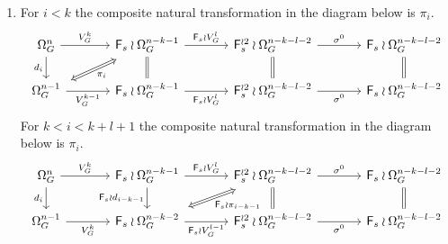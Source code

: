 \documentclass[a4paper,10pt]{article}%
\begin{document}
\begin{proposition}
\begin{enumerate}[label=(\alph*)]
\item
For $i<k$ the composite natural transformation in the diagram below is $\pi_i$.
\begin{equation}\label{INDPI1 EQ}
\begin{tikzcd}[row sep=1.7em,column sep = 3.5em]
	\Omega_{G}^{n} \ar{d}[swap]{d_{i}} \ar{r}{V_G^k} &
	|[alias=F1]|
	\Fin_s \wr \Omega_{G}^{n-k-1} \ar{r}{\Fin_s \wr V_{G}^l} 
	\ar[equal]{d} &
	\Fin_s^{\wr 2} \wr \Omega_G^{n-k-l-2} \ar[equal]{d} \ar{r}{\sigma^0} &
	\Fin_s \wr \Omega_G^{n-k-l-2} \ar[equal]{d}
\\
	|[alias=G2]|
	\Omega_{G}^{n-1} \ar{r}[swap]{V_G^{k-1}}&
	\Fin_s \wr \Omega_{G}^{n-k-1} \ar{r}[swap]{\Fin_s \wr V_{G}^{l}} &
	\Fin_s^{\wr 2} \wr  \Omega_G^{n-k-l-2} \ar{r}[swap]{\sigma^0} &
	\Fin_s \wr  \Omega_G^{n-k-l-2}
\arrow[Leftrightarrow, from=F1, to=G2,shorten >=0.15cm,shorten <=0.15cm,"\pi_{i}"]
\end{tikzcd}
\end{equation}
For $k< i < k+l+1$ the composite natural transformation in the diagram below is $\pi_{i}$.
\begin{equation}\label{INDPI2 EQ}
\begin{tikzcd}[row sep=1.7em,column sep = 3.5em]
	\Omega_{G}^{n} \ar{d}[swap]{d_{i}} \ar{r}{V_G^k} &
	\Fin_s \wr \Omega_{G}^{n-k-1} \ar{r}{\Fin_s \wr V_{G}^l} 
	\ar{d}[swap]{\Fin_s \wr d_{i-k-1}} &
	|[alias=F1]|
	\Fin_s^{\wr 2} \wr \Omega_G^{n-k-l-2} \ar[equal]{d} \ar{r}{\sigma^0} &
	\Fin_s \wr \Omega_G^{n-k-l-2} \ar[equal]{d}
\\
	\Omega_{G}^{n-1} \ar{r}[swap]{V_G^k}&
	|[alias=G2]|
	\Fin_s \wr \Omega_{G}^{n-k-2} \ar{r}[swap]{\Fin_s \wr V_{G}^{l-1}} &
	\Fin_s^{\wr 2} \wr  \Omega_G^{n-k-l-2} \ar{r}[swap]{\sigma^0} &
	\Fin_s \wr  \Omega_G^{n-k-l-2}
\arrow[Leftrightarrow, from=F1, to=G2,shorten >=0.15cm,shorten <=0.15cm,"\Fin_s \wr \pi_{i-k-1}"]
\end{tikzcd}
\end{equation}


\end{enumerate}
\end{proposition}
\end{document}

